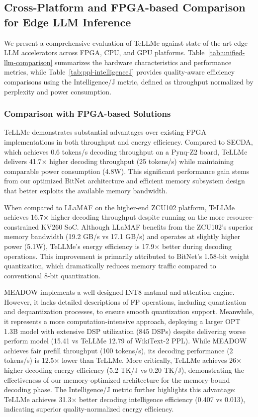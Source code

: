\documentclass[sigconf]{acmart}
\begin{document}
\subsection{Cross-Platform and FPGA-based Comparison for Edge LLM Inference}
We present a comprehensive evaluation of TeLLMe against state-of-the-art edge LLM accelerators across FPGA, CPU, and GPU platforms. Table~\ref{tab:unified-llm-comparison} summarizes the hardware characteristics and performance metrics, while Table~\ref{tab:ppl-intelligenceJ} provides quality-aware efficiency comparisons using the Intelligence/J metric, defined as throughput normalized by perplexity and power consumption.

\subsubsection{Comparison with FPGA-based Solutions}

TeLLMe demonstrates substantial advantages over existing FPGA implementations in both throughput and energy efficiency. Compared to SECDA, which achieves 0.6 tokens/s decoding throughput on a Pynq-Z2 board, TeLLMe delivers 41.7$\times$ higher decoding throughput (25 tokens/s) while maintaining comparable power consumption (4.8W). This significant performance gain stems from our optimized BitNet architecture and efficient memory subsystem design that better exploits the available memory bandwidth.

When compared to LLaMAF on the higher-end ZCU102 platform, TeLLMe achieves 16.7$\times$ higher decoding throughput despite running on the more resource-constrained KV260 SoC. Although LLaMAF benefits from the ZCU102's superior memory bandwidth (19.2 GB/s vs 17.1 GB/s) and operates at slightly higher power (5.1W), TeLLMe's energy efficiency is 17.9$\times$ better during decoding operations. This improvement is primarily attributed to BitNet's 1.58-bit weight quantization, which dramatically reduces memory traffic compared to conventional 8-bit quantization.

MEADOW implements a well-designed INT8 matmul and attention engine. However, it lacks detailed descriptions of FP operations, including quantization and dequantization processes, to ensure smooth quantization support. Meanwhile, it represents a more computation-intensive approach, deploying a larger OPT 1.3B model with extensive DSP utilization (845 DSPs) despite delivering worse perform model (15.41 vs TeLLMe 12.79 of WikiText-2 PPL). While MEADOW achieves fair prefill throughput (100 tokens/s), its decoding performance (2 tokens/s) is 12.5$\times$ lower than TeLLMe. More critically, TeLLMe achieves 26$\times$ higher decoding energy efficiency (5.2 TK/J vs 0.20 TK/J), demonstrating the effectiveness of our memory-optimized architecture for the memory-bound decoding phase. The Intelligence/J metric further highlights this advantage: TeLLMe achieves 31.3$\times$ better decoding intelligence efficiency (0.407 vs 0.013), indicating superior quality-normalized energy efficiency. 
\end{document}
